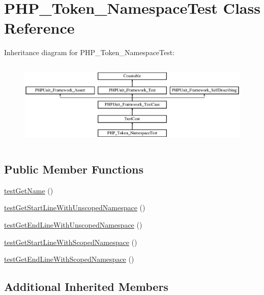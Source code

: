 \hypertarget{class_p_h_p___token___namespace_test}{}\section{P\+H\+P\+\_\+\+Token\+\_\+\+Namespace\+Test Class Reference}
\label{class_p_h_p___token___namespace_test}
Inheritance diagram for P\+H\+P\+\_\+\+Token\+\_\+\+Namespace\+Test\+:\begin{figure}[H]
\begin{center}
\leavevmode
\includegraphics[height=4.129793cm]{class_p_h_p___token___namespace_test}
\end{center}
\end{figure}
\subsection*{Public Member Functions}
\begin{DoxyCompactItemize}
\item 
\mbox{\hyperlink{class_p_h_p___token___namespace_test_a20d1601e22a17dad9eb8c9050676ef70}{test\+Get\+Name}} ()
\item 
\mbox{\hyperlink{class_p_h_p___token___namespace_test_ad6908550db0e328c1fe94a8c77b12cec}{test\+Get\+Start\+Line\+With\+Unscoped\+Namespace}} ()
\item 
\mbox{\hyperlink{class_p_h_p___token___namespace_test_a91d63ae48ad2bc3eec141ba333e8ab31}{test\+Get\+End\+Line\+With\+Unscoped\+Namespace}} ()
\item 
\mbox{\hyperlink{class_p_h_p___token___namespace_test_a85d53a8fcf97fa7b53622d46251f71d8}{test\+Get\+Start\+Line\+With\+Scoped\+Namespace}} ()
\item 
\mbox{\hyperlink{class_p_h_p___token___namespace_test_ae31aa34be07db267374e48e1b91e8d96}{test\+Get\+End\+Line\+With\+Scoped\+Namespace}} ()
\end{DoxyCompactItemize}
\subsection*{Additional Inherited Members}


